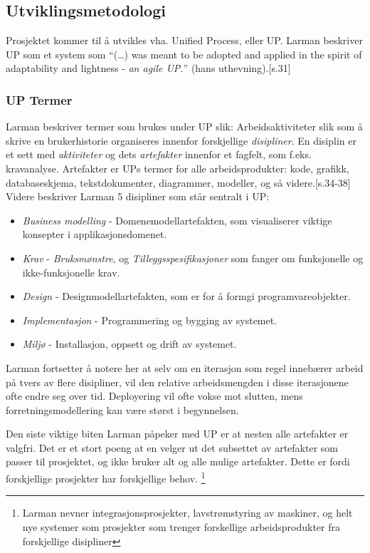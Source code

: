 \documentclass[11pt]{article}
\begin{document}
\subsection{Utviklingsmetodologi}
Prosjektet kommer til å utvikles vha. Unified Process, eller UP.
Larman beskriver UP som et system som ``(…) was meant to be adopted and applied in the spirit of adaptability and lightness - \emph{an agile UP.}'' (hans uthevning).\cite{Larman2005}[s.31]

\subsubsection{UP Termer}
\label{subsec:up-termer}
Larman beskriver termer som brukes under UP slik:
Arbeidsaktiviteter slik som å skrive en brukerhistorie organiseres innenfor forskjellige \emph{disipliner}.
En disiplin er et sett med \emph{aktiviteter} og dets \emph{artefakter} innenfor et fagfelt, som f.eks. kravanalyse.
Artefakter er UPs termer for alle arbeidsprodukter: kode, grafikk, databaseskjema, tekstdokumenter, diagrammer, modeller, og så videre.\cite{Larman2005}[s.34-38]
Videre beskriver Larman 5 disipliner som står sentralt i UP:
\begin{itemize}
\item \emph{Business modelling} - Domenemodellartefakten, som visualiserer viktige konsepter i applikasjonsdomenet.
\item \emph{Krav} - \emph{Bruksmønstre}, og \emph{Tilleggsspesifikasjoner} som fanger om funksjonelle og ikke-funksjonelle krav.
\item \emph{Design} - Designmodellartefakten, som er for å formgi programvareobjekter.
\item \emph{Implementasjon} - Programmering og bygging av systemet.
\item \emph{Miljø} - Installasjon, oppsett og drift av systemet.
\end{itemize}

Larman fortsetter å notere her at selv om en iterasjon som regel innebærer arbeid på tvers av flere disipliner, vil den relative arbeidsmengden i disse iterasjonene ofte endre seg over tid. Deployering vil ofte vokse mot slutten, mens forretningsmodellering kan være størst i begynnelsen.

Den siste viktige biten Larman påpeker med UP er at nesten alle artefakter er valgfri.
Det er et stort poeng at en velger ut det subsettet av artefakter som passer til prosjektet, og ikke bruker alt og alle mulige artefakter.
Dette er fordi forskjellige prosjekter har forskjellige behov. \footnote{Larman nevner integrasjonsprosjekter, lavstrømstyring av maskiner, og helt nye systemer som prosjekter som trenger forskellige arbeidsprodukter fra forskjellige disipliner}
\end{document}
